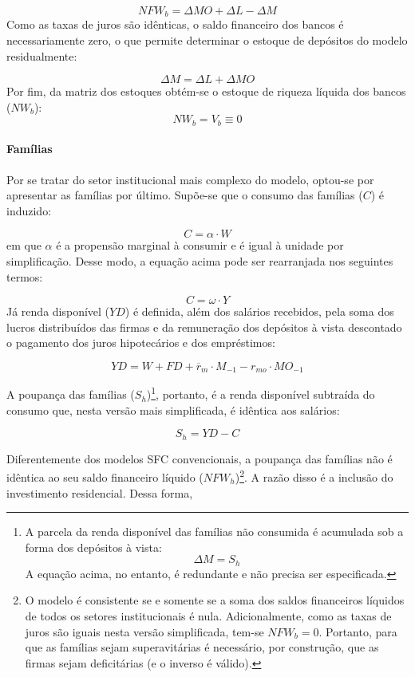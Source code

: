 $$
NFW_b = \Delta MO + \Delta L - \Delta M
$$
Como as taxas de juros são idênticas, o saldo financeiro dos bancos é necessariamente zero, o que permite determinar o estoque de depósitos do modelo residualmente:

\begin{equation}
\label{_M}
    \Delta M = \Delta L + \Delta MO
\end{equation}
Por fim, da matriz dos estoques obtém-se o estoque de riqueza líquida dos bancos ($NW_b$):
\begin{equation}
    NW_b = V_b \equiv 0
\end{equation}

\paragraph*{Famílias} 
Por se tratar do setor institucional mais complexo do modelo, optou-se por apresentar as famílias por último. Supõe-se que o consumo das famílias ($C$) é induzido:

\begin{equation}
\label{_C}
    C = \alpha\cdot W
\end{equation}
em que $\alpha$ é a propensão marginal à consumir e é igual à unidade por simplificação. Desse modo, a equação acima pode ser rearranjada nos seguintes termos:

$$
C = \omega\cdot Y
$$
Já renda disponível ($YD$) é definida, além dos salários recebidos, pela soma dos lucros distribuídos das firmas e da remuneração dos depósitos à vista descontado o pagamento dos juros hipotecários e dos empréstimos:

\begin{equation}
    \label{EqYD}
    YD = W + FD + \overline r_m\cdot M_{-1} - r_{mo}\cdot MO_{-1}
\end{equation}

A poupança das famílias ($S_h$)\footnote{
A parcela da renda disponível das famílias não consumida é acumulada sob a forma dos depósitos à vista:
$$
\Delta M = S_h
$$
A equação acima, no entanto, é redundante e não precisa ser especificada.}, portanto, é a renda disponível subtraída do consumo que, nesta versão mais simplificada, é idêntica aos salários:

\begin{equation}
    \label{EqSh}
    S_h = YD - C
\end{equation}

Diferentemente dos modelos SFC convencionais, a poupança das famílias não é idêntica ao seu saldo financeiro líquido ($NFW_h$)\footnote{O modelo é consistente se e somente se a soma dos saldos financeiros líquidos de todos os setores institucionais é nula. Adicionalmente, como as taxas de juros são iguais nesta versão simplificada, tem-se $NFW_b = 0$. Portanto, para que as famílias sejam superavitárias é necessário, por construção, que as firmas sejam deficitárias (e o inverso é válido).
}. A razão disso é a inclusão do investimento residencial. Dessa forma, 

